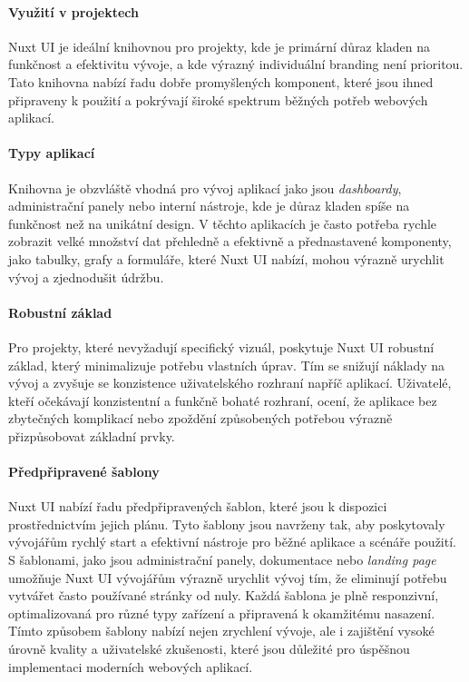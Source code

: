 \paragraph{Využití v projektech}
Nuxt UI je ideální knihovnou pro projekty, kde je primární důraz kladen na funkčnost a efektivitu vývoje, a kde výrazný individuální branding není prioritou. Tato knihovna nabízí řadu dobře promyšlených komponent, které jsou ihned připraveny k použití a pokrývají široké spektrum běžných potřeb webových aplikací.

\paragraph{Typy aplikací}
Knihovna je obzvláště vhodná pro vývoj aplikací jako jsou \emph{dashboardy}, administrační panely nebo interní nástroje, kde je důraz kladen spíše na funkčnost než na unikátní design. V těchto aplikacích je často potřeba rychle zobrazit velké množství dat přehledně a efektivně a přednastavené komponenty, jako tabulky, grafy a formuláře, které Nuxt UI nabízí, mohou výrazně urychlit vývoj a zjednodušit údržbu.

\paragraph{Robustní základ}
Pro projekty, které nevyžadují specifický vizuál, poskytuje Nuxt UI robustní základ, který minimalizuje potřebu vlastních úprav. Tím se snižují náklady na vývoj a zvyšuje se konzistence uživatelského rozhraní napříč aplikací. Uživatelé, kteří očekávají konzistentní a funkčně bohaté rozhraní, ocení, že aplikace  bez zbytečných komplikací nebo zpoždění způsobených potřebou výrazně přizpůsobovat základní prvky.

\paragraph{Předpřipravené šablony}
Nuxt UI nabízí řadu předpřipravených šablon, které jsou k dispozici prostřednictvím jejich  plánu. Tyto šablony jsou navrženy tak, aby poskytovaly vývojářům rychlý start a efektivní nástroje pro běžné aplikace a scénáře použití. S šablonami, jako jsou administrační panely, dokumentace nebo \emph{landing page} umožňuje Nuxt UI vývojářům výrazně urychlit vývoj tím, že eliminují potřebu vytvářet často používané stránky od nuly. Každá šablona je plně responzivní, optimalizovaná pro různé typy zařízení a připravená k okamžitému nasazení. Tímto způsobem šablony nabízí nejen zrychlení vývoje, ale i zajištění vysoké úrovně kvality a uživatelské zkušenosti, které jsou důležité pro úspěšnou implementaci moderních webových aplikací. \cite{NuxtUITemplates}

